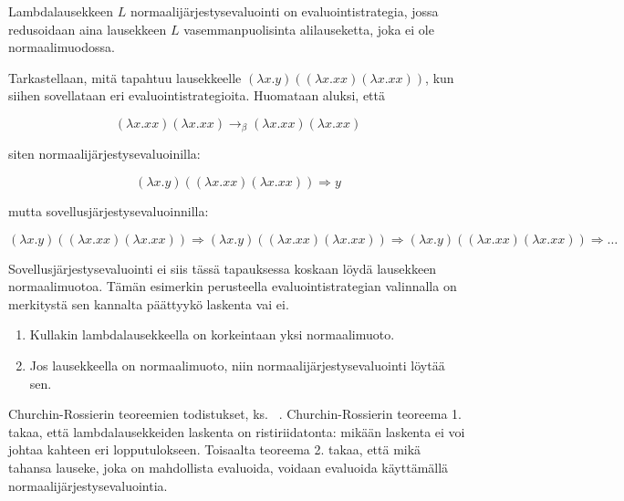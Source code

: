 \begin{alg}[normaalijärjestysevaluointi]
Lambdalausekkeen $L$ normaalijärjestysevaluointi on evaluointistrategia, jossa redusoidaan aina lausekkeen $L$ vasemmanpuolisinta alilauseketta, joka ei ole normaalimuodossa.
\end{alg}

\begin{esim}
Tarkastellaan, mitä tapahtuu lausekkeelle $(\lambda x . y) ((\lambda x . xx) (\lambda x . xx))$, kun siihen sovellataan eri evaluointistrategioita. Huomataan aluksi, että  

\[ (\lambda x . xx) (\lambda x . xx) \rightarrow_{\beta} (\lambda x . xx) (\lambda x . xx) \]

siten normaalijärjestysevaluoinilla:

\[ (\lambda x . y) ((\lambda x . xx) (\lambda x . xx)) \Longrightarrow y \]

mutta sovellusjärjestysevaluoinnilla:

\[  (\lambda x . y) ((\lambda x . xx) (\lambda x . xx)) \Longrightarrow
	(\lambda x . y) ((\lambda x . xx) (\lambda x . xx)) \Longrightarrow
	(\lambda x . y) ((\lambda x . xx) (\lambda x . xx)) \Longrightarrow \ldots \]
	
Sovellusjärjestysevaluointi ei siis tässä tapauksessa koskaan löydä lausekkeen normaalimuotoa. Tämän esimerkin perusteella evaluointistrategian valinnalla on merkitystä sen kannalta päättyykö laskenta vai ei. 
\end{esim}


\begin{lau}
\begin{enumerate} $ $\newline
	\item Kullakin lambdalausekkeella on korkeintaan yksi normaalimuoto.
	\item Jos lausekkeella on normaalimuoto, niin normaalijärjestysevaluointi löytää sen. 
\end{enumerate}
\end{lau}

Churchin-Rossierin teoreemien todistukset, ks. ~\cite[s.~23--30]{HBEB2000}. Churchin-Rossierin teoreema 1. takaa, että lambdalausekkeiden laskenta on ristiriidatonta: mikään laskenta ei voi johtaa kahteen eri lopputulokseen. Toisaalta teoreema 2. takaa, että mikä tahansa lauseke, joka on mahdollista evaluoida, voidaan evaluoida käyttämällä normaalijärjestysevaluointia.
